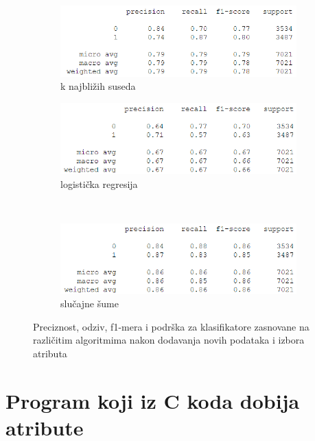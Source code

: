 \documentclass[12pt,oneside]{memoir}
\begin{document}
\begin{figure}[!ht]
    \centering
    \begin{subfigure}[b]{0.45\textwidth}
        \centering
        \includegraphics[width=\textwidth]{knn_final}
        \caption{k najbližih suseda}
        \label{fig:kn_final}
    \end{subfigure}
    \begin{subfigure}[b]{0.45\textwidth}
        \centering
        \includegraphics[width=\textwidth]{logreg_final}
        \caption{logistička regresija}
        \label{fig:logreg_final}
    \end{subfigure}
    \\
    \begin{subfigure}[b]{0.45\textwidth}
        \centering
        \includegraphics[width=\textwidth]{randfor_final}
        \caption{slučajne šume}
        \label{fig:randfor_final}
    \end{subfigure}
    \caption{Preciznost, odziv, f1-mera i podrška za klasifikatore zasnovane na različitim algoritmima nakon dodavanja novih podataka i izbora atributa}
    \label{fig:dodatno3}
\end{figure}

% 

\section{Program koji iz C koda dobija atribute}
\end{document}
